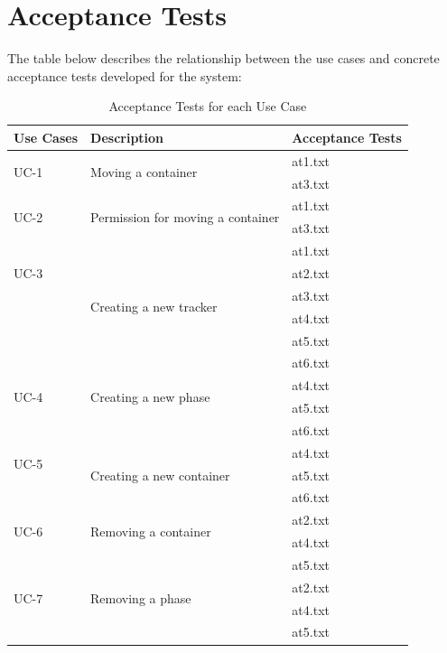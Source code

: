 \section{Acceptance Tests}

The table below describes the relationship between the use cases and concrete acceptance tests developed for the system:

\begin{table}[!ht]
\centering
\begin{tabular}{|l|l|l|}
\hline
Use Cases & Description & Acceptance Tests \\ \hline
\multirow{2}{*}{UC-1} & \multirow{2}{*}{Moving a container} & at1.txt \\ \cline{3-3} 
 &  & at3.txt \\ \hline
\multirow{2}{*}{UC-2} & \multirow{2}{*}{Permission for moving a container} & at1.txt \\ \cline{3-3} 
 &  & at3.txt \\ \hline
\multirow{3}{*}{UC-3} & \multirow{6}{*}{Creating a new tracker} & at1.txt \\ \cline{3-3} 
 &  & at2.txt \\ \cline{3-3}
 &  & at3.txt \\ \cline{3-3} 
 &  & at4.txt \\ \cline{3-3} 
 &  & at5.txt \\ \cline{3-3} 
 &  & at6.txt \\ \hline
\multirow{2}{*}{UC-4} & \multirow{2}{*}{Creating a new phase} & at4.txt \\ \cline{3-3} 
  &  & at5.txt \\ \cline{3-3}
 &  & at6.txt \\ \hline
\multirow{2}{*}{UC-5} & \multirow{3}{*}{Creating a new container} & at4.txt \\ \cline{3-3} 
 &  & at5.txt \\ \cline{3-3}
 &  & at6.txt \\ \hline
\multirow{2}{*}{UC-6} & \multirow{2}{*}{Removing a container} & at2.txt \\ \cline{3-3} 
	&  & at4.txt \\ \cline{3-3} 
 &  & at5.txt \\ \hline
\multirow{2}{*}{UC-7} & \multirow{2}{*}{Removing a phase} & at2.txt \\ \cline{3-3} 
	&  & at4.txt \\ \cline{3-3} 
 &  & at5.txt \\ \hline
\end{tabular}
\caption{Acceptance Tests for each Use Case}
\label{my-label}
\end{table}

